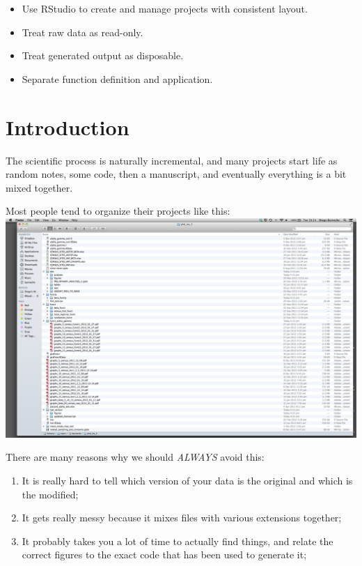 \documentclass[]{book}
\providecommand{\tightlist}{%
  \setlength{\itemsep}{0pt}\setlength{\parskip}{0pt}}
\begin{document}
\begin{itemize}
\tightlist
\item
  Use RStudio to create and manage projects with consistent layout.\\
\item
  Treat raw data as read-only.\\
\item
  Treat generated output as disposable.\\
\item
  Separate function definition and application.
\end{itemize}

\section{Introduction}\label{introduction-1}

The scientific process is naturally incremental, and many projects start
life as random notes, some code, then a manuscript, and eventually
everything is a bit mixed together.

Most people tend to organize their projects like this:
\includegraphics{../fig/bad_layout.png}

There are many reasons why we should \emph{ALWAYS} avoid this:

\begin{enumerate}
\def\labelenumi{\arabic{enumi}.}
\tightlist
\item
  It is really hard to tell which version of your data is the original
  and which is the modified;
\item
  It gets really messy because it mixes files with various extensions
  together;
\item
  It probably takes you a lot of time to actually find things, and
  relate the correct figures to the exact code that has been used to
  generate it;
\end{enumerate}
\end{document}
